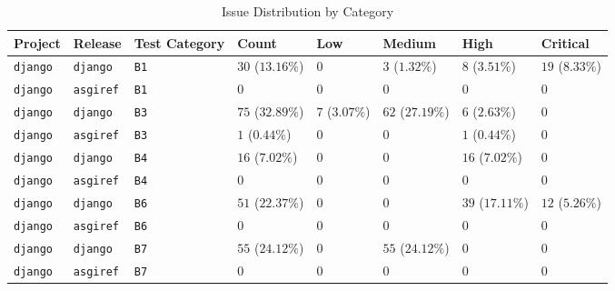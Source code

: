 \begin{table}
\caption{Issue Distribution by Category}
\label{tab:issue-category-distribution}
\begin{tabular}{llllllll}
\toprule
Project & Release & Test Category & Count & Low & Medium & High & Critical \\
\midrule
\texttt{django} & \texttt{django} & \texttt{B1} & $30$ ($13.16\%$) & $0$ & $3$ ($1.32\%$) & $8$ ($3.51\%$) & $19$ ($8.33\%$) \\
\texttt{django} & \texttt{asgiref} & \texttt{B1} & $0$ & $0$ & $0$ & $0$ & $0$ \\
\texttt{django} & \texttt{django} & \texttt{B3} & $75$ ($32.89\%$) & $7$ ($3.07\%$) & $62$ ($27.19\%$) & $6$ ($2.63\%$) & $0$ \\
\texttt{django} & \texttt{asgiref} & \texttt{B3} & $1$ ($0.44\%$) & $0$ & $0$ & $1$ ($0.44\%$) & $0$ \\
\texttt{django} & \texttt{django} & \texttt{B4} & $16$ ($7.02\%$) & $0$ & $0$ & $16$ ($7.02\%$) & $0$ \\
\texttt{django} & \texttt{asgiref} & \texttt{B4} & $0$ & $0$ & $0$ & $0$ & $0$ \\
\texttt{django} & \texttt{django} & \texttt{B6} & $51$ ($22.37\%$) & $0$ & $0$ & $39$ ($17.11\%$) & $12$ ($5.26\%$) \\
\texttt{django} & \texttt{asgiref} & \texttt{B6} & $0$ & $0$ & $0$ & $0$ & $0$ \\
\texttt{django} & \texttt{django} & \texttt{B7} & $55$ ($24.12\%$) & $0$ & $55$ ($24.12\%$) & $0$ & $0$ \\
\texttt{django} & \texttt{asgiref} & \texttt{B7} & $0$ & $0$ & $0$ & $0$ & $0$ \\
\bottomrule
\end{tabular}
\end{table}
